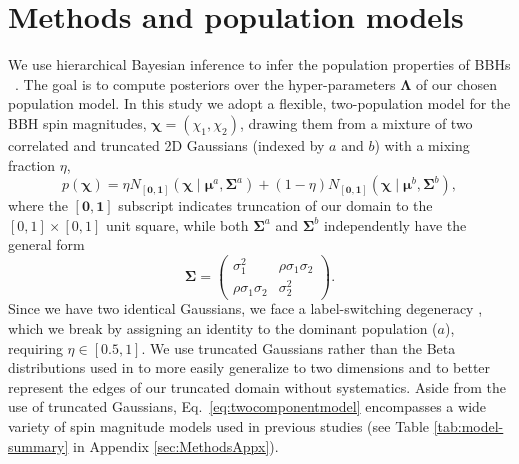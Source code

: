 \documentclass[twocolumn,usenames,dvipsnames,linenumbers]{aastex631}
\begin{document}
\section{Methods and population models}
\label{sec:Methods}

We use hierarchical Bayesian inference to infer the population properties of \acp{BBH} ~\citep[e.g.,][]{Loredo:2004nn,Mandel:2018mve,Thrane:2018qnx,Vitale:2020aaz}.
The goal is to compute posteriors over the hyper-parameters $\boldsymbol{\Lambda}$ of our chosen population model.
In this study we adopt a flexible, two-population model for the BBH spin magnitudes, $\bm{\chi}=(\chi_1, \chi_2)$, drawing them from a mixture of two correlated and truncated 2D Gaussians (indexed by $a$ and $b$) with a mixing fraction $\eta$,
\begin{equation}
	p(\bm{\chi}) = \eta N_{[\boldsymbol{0},\boldsymbol{1}]}
	\left(\bm{\chi} \mid \bm{\mu}^a, \boldsymbol{\Sigma}^a\right)
	+(1-\eta) N_{[\boldsymbol{0},\boldsymbol{1}]}
	\left(\bm{\chi} \mid \bm{\mu}^b, \boldsymbol{\Sigma}^b\right),
	\label{eq:twocomponentmodel}
\end{equation}
where the $[\boldsymbol{0},\boldsymbol{1}]$ subscript indicates truncation of our domain to the $[0,1]\times[0,1]$ unit square, while both $\bm{\Sigma}^a$ and $\bm{\Sigma}^b$ independently have the general form
\begin{equation}
	\bm{\Sigma}  = \begin{pmatrix}
		\sigma_1^2 & \rho \sigma_1 \sigma_2 \\
		\rho \sigma_1 \sigma_2 &  \sigma_2^2
	\end{pmatrix} .
\end{equation}
Since we have two identical Gaussians, we face a label-switching degeneracy \cite[e.g.][]{2019PhRvD.100h4041B}, which we break by assigning an identity to the dominant population ($a$), requiring $\eta \in [0.5,1]$. 
We use truncated Gaussians rather than the Beta distributions used in \cite{KAGRA:2021duu} to more easily generalize to two dimensions and to better represent the edges of our truncated domain without systematics.
Aside from the use of truncated Gaussians, Eq.~\eqref{eq:twocomponentmodel} encompasses a wide variety of spin magnitude models used in previous studies (see Table \ref{tab:model-summary} in Appendix \ref{sec:MethodsAppx}).
\end{document}
